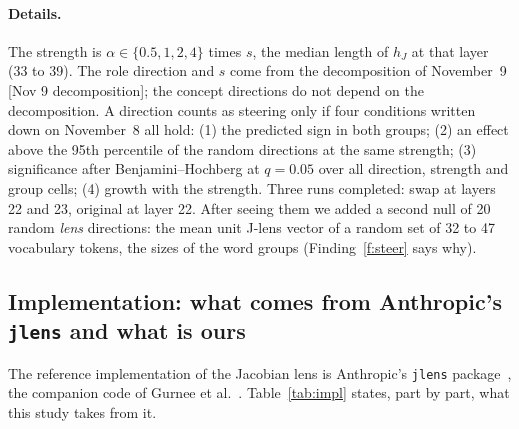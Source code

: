 \documentclass[11pt]{article}
\newcommand{\src}[1]{{\small[#1]}}
\newcommand{\jlens}{\texttt{jlens}}
\begin{document}
\paragraph{Details.} The strength is $\alpha\in\{0.5,1,2,4\}$ times $s$, the median length of $h_J$ at that layer (33 to
39). The role direction and $s$ come from the decomposition of November~9 \src{Nov 9 decomposition}; the concept directions
do not depend on the decomposition. A direction counts as steering only if four conditions written down on November~8 all hold: (1) the predicted sign in
both groups; (2) an effect above the 95th percentile of the random directions at the same strength; (3) significance after
Benjamini--Hochberg at $q=0.05$ over all direction, strength and group cells; (4) growth with the strength. Three runs
completed: swap at layers 22 and 23, original at layer 22. After seeing them we added a second null of 20 random
\emph{lens} directions: the mean unit J-lens vector of a random set of 32 to 47 vocabulary tokens, the sizes of the word
groups (Finding~\ref{f:steer} says why).

\subsection{Implementation: what comes from Anthropic's \jlens{} and what is ours}\label{sec:impl}

The reference implementation of the Jacobian lens is Anthropic's \jlens{} package~\cite{jlens}, the companion code of
Gurnee et al.~\cite{gurnee2026workspace}. Table~\ref{tab:impl} states, part by part, what this study takes from it.
\end{document}
